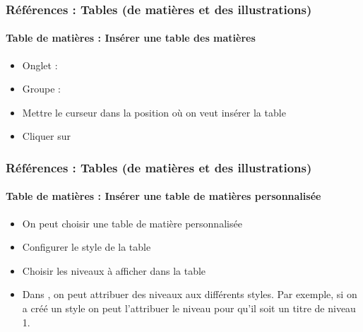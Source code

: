 \documentclass[xcolor=table]{beamer}
\begin{document}
\begin{frame}
\frametitle{Références : Tables (de matières et des illustrations)}
\framesubtitle{Table de matières : Insérer une table des matières}

\begin{minipage}{0.59\textwidth}
	\begin{itemize}
		\item Onglet : 
		\item Groupe : 
		\item Mettre le curseur dans la position où on veut insérer la table
		\item Cliquer sur 
	\end{itemize}
\end{minipage}
\begin{minipage}{0.40\textwidth}
\end{minipage}

\end{frame}

\begin{frame}
\frametitle{Références : Tables (de matières et des illustrations)}
\framesubtitle{Table de matières : Insérer une table de matières personnalisée}

\begin{minipage}{0.59\textwidth}
	\begin{itemize}
		\item On peut choisir une table de matière personnalisée
		\item Configurer le style de la table 
		\item Choisir les niveaux à afficher dans la table
		\item Dans , on peut attribuer des niveaux aux différents styles. 
		Par exemple, si on a créé un style  on peut l'attribuer le niveau  pour qu'il soit un titre de niveau 1.
	\end{itemize}
\end{minipage}
\begin{minipage}{0.40\textwidth}
	
\end{minipage}

\end{frame}

\end{document}
